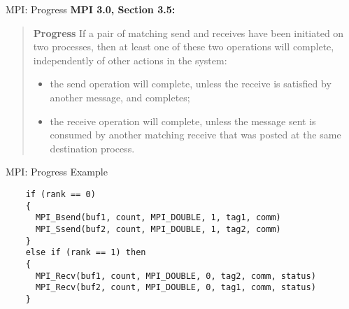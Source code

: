 \documentclass[english,compress]{beamer}
\begin{document}
\begin{frame}{MPI: Progress}
  \textbf{MPI 3.0, Section 3.5:}

  \begin{quote}
    \upshape
    \textbf{Progress} If a pair of matching send and receives have
    been initiated on two processes, then at least one of these two
    operations will complete, independently of other actions in the
    system:

    \begin{itemize}
      \item the send operation will complete, unless the receive is
        satisfied by another message, and completes; 
      \item the receive operation will complete, unless the
        message sent is consumed by another matching receive that 
        was posted at the same destination process.
    \end{itemize}
  \end{quote}
\end{frame}
\begin{frame}[fragile]{MPI: Progress Example}
  \begin{lstlisting}
    if (rank == 0)
    {
      MPI_Bsend(buf1, count, MPI_DOUBLE, 1, tag1, comm)
      MPI_Ssend(buf2, count, MPI_DOUBLE, 1, tag2, comm)
    }
    else if (rank == 1) then
    {
      MPI_Recv(buf1, count, MPI_DOUBLE, 0, tag2, comm, status)
      MPI_Recv(buf2, count, MPI_DOUBLE, 0, tag1, comm, status)
    }
  \end{lstlisting}
\end{frame}









\questionframe{}
\end{document}
